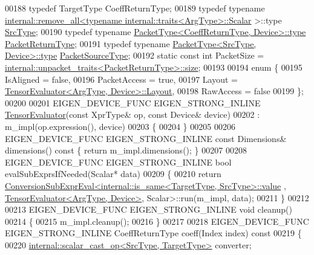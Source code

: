 \begin{DoxyCode}
00188   \textcolor{keyword}{typedef} TargetType CoeffReturnType;
00189   \textcolor{keyword}{typedef} \textcolor{keyword}{typename} 
      \hyperlink{struct_eigen_1_1internal_1_1remove__all}{internal::remove\_all<typename internal::traits<ArgType>::Scalar}
      >::type \hyperlink{group___sparse_core___module}{SrcType};
00190   \textcolor{keyword}{typedef} \textcolor{keyword}{typename} \hyperlink{group___sparse_core___module}{PacketType<CoeffReturnType, Device>::type} 
      \hyperlink{group___sparse_core___module}{PacketReturnType};
00191   \textcolor{keyword}{typedef} \textcolor{keyword}{typename} \hyperlink{group___sparse_core___module}{PacketType<SrcType, Device>::type} 
      \hyperlink{group___sparse_core___module}{PacketSourceType};
00192   \textcolor{keyword}{static} \textcolor{keyword}{const} \textcolor{keywordtype}{int} PacketSize = 
      \hyperlink{struct_eigen_1_1internal_1_1unpacket__traits}{internal::unpacket\_traits<PacketReturnType>::size};
00193 
00194   \textcolor{keyword}{enum} \{
00195     IsAligned = \textcolor{keyword}{false},
00196     PacketAccess = \textcolor{keyword}{true},
00197     Layout = \hyperlink{struct_eigen_1_1_tensor_evaluator}{TensorEvaluator<ArgType, Device>::Layout},
00198     RawAccess = \textcolor{keyword}{false}
00199   \};
00200 
00201   EIGEN\_DEVICE\_FUNC EIGEN\_STRONG\_INLINE \hyperlink{struct_eigen_1_1_tensor_evaluator}{TensorEvaluator}(\textcolor{keyword}{const} XprType& op, \textcolor{keyword}{const} Device& 
      device)
00202     : m\_impl(op.expression(), device)
00203   \{
00204   \}
00205 
00206   EIGEN\_DEVICE\_FUNC EIGEN\_STRONG\_INLINE \textcolor{keyword}{const} Dimensions& dimensions()\textcolor{keyword}{ const }\{ \textcolor{keywordflow}{return} m\_impl.dimensions(); 
      \}
00207 
00208   EIGEN\_DEVICE\_FUNC EIGEN\_STRONG\_INLINE \textcolor{keywordtype}{bool} evalSubExprsIfNeeded(Scalar* data)
00209   \{
00210     \textcolor{keywordflow}{return} \hyperlink{struct_eigen_1_1_conversion_sub_expr_eval}{ConversionSubExprEval<internal::is\_same<TargetType, SrcType>::value}
      , \hyperlink{struct_eigen_1_1_tensor_evaluator}{TensorEvaluator<ArgType, Device>}, Scalar>::run(m\_impl, data);
00211   \}
00212 
00213   EIGEN\_DEVICE\_FUNC EIGEN\_STRONG\_INLINE \textcolor{keywordtype}{void} cleanup()
00214   \{
00215     m\_impl.cleanup();
00216   \}
00217 
00218   EIGEN\_DEVICE\_FUNC EIGEN\_STRONG\_INLINE CoeffReturnType coeff(Index index)\textcolor{keyword}{ const}
00219 \textcolor{keyword}{  }\{
00220     \hyperlink{struct_eigen_1_1internal_1_1scalar__cast__op}{internal::scalar\_cast\_op<SrcType, TargetType>} converter;

\end{DoxyCode}
